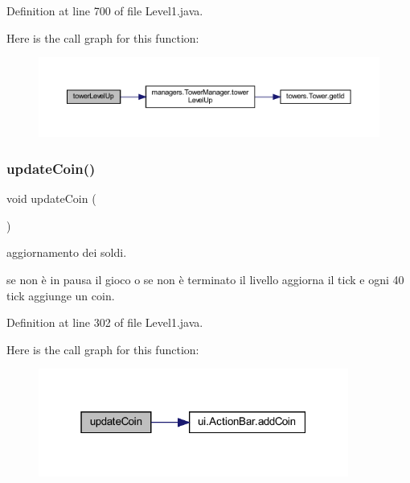 Definition at line 700 of file Level1.\+java.

Here is the call graph for this function\+:\nopagebreak
\begin{figure}[H]
\begin{center}
\leavevmode
\includegraphics[width=350pt]{classscenes_1_1_level1_a8a3c715fcfd3d65e1d8241a1fa4965ff_cgraph}
\end{center}
\end{figure}
\mbox{\label{classscenes_1_1_level1_a7ca93fcd8c7440e7b3f64c595a5be28c}} 
\subsubsection{\texorpdfstring{update\+Coin()}{updateCoin()}}
{\footnotesize\ttfamily void update\+Coin (\begin{DoxyParamCaption}{ }\end{DoxyParamCaption})}



aggiornamento dei soldi. 

se non è in pausa il gioco o se non è terminato il livello aggiorna il tick e ogni 40 tick aggiunge un coin. 

Definition at line 302 of file Level1.\+java.

Here is the call graph for this function\+:\nopagebreak
\begin{figure}[H]
\begin{center}
\leavevmode
\includegraphics[width=289pt]{classscenes_1_1_level1_a7ca93fcd8c7440e7b3f64c595a5be28c_cgraph}
\end{center}
\end{figure}
\mbox{\label{classscenes_1_1_level1_af005ec68c869a6acd5e833cba9330a50}} 
